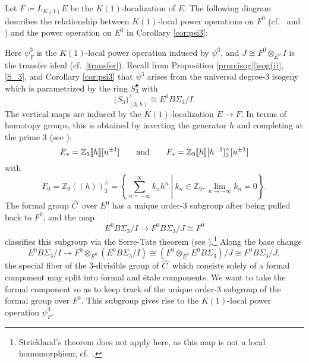 \documentclass{gtpart}
\theoremstyle{definition}
\theoremstyle{remark}
\newcommand{\mb}[1]{\mathbb{#1}}
\newcommand{\BZ}{{\mb Z}}
\newcommand{\HC}{\widehat{C~}\!}
\newcommand{\ad}{{\rm and}}
\newcommand{\p}{\psi^3}
\newcommand{\s}{S^\bullet}
\newcommand{\isog}[1]{Proposition \ref{prop:isog}\thinspace \eqref{isog(#1)}}
\begin{document}
Let $F \coloneqq L_{K(1)} E$ be the $K(1)$-localization of $E$.  The 
following diagram describes the relationship between $K(1)$-local power 
operations on $F^0$ (cf.~\cite[Section 3]{hopkins} and 
\cite[Section IX.3]{H_infty}) and the power operation on $E^0$ in 
Corollary \ref{cor:psi3}: 
\begin{center}
\end{center}
Here $\psi_F^3$ is the $K(1)$-local power operation induced by $\p$, and 
$J \cong F^0 \otimes_{E^0} I$ is the transfer ideal 
(cf.~\eqref{transfer}).  Recall from \isog{i}, \eqref{S_3}, and 
Corollary \ref{cor:psi3} that $\p$ arises from the universal degree-3 
isogeny which is parametrized by the ring $\s_3$ with 
\[
 \big( S_3 \big)_{(3,h)}^\wedge \cong E^0 B\Sigma_3 / I.  
\]
The vertical maps are induced by the $K(1)$-localization $E \to F$.  In 
terms of homotopy groups, this is obtained by inverting the generator 
$h$ and completing at the prime 3 (see \cite[Corollary 1.5.5]{hovey}): 
\[
 E_* = \BZ_9 \llbracket h \rrbracket [u^{\pm1}] \qquad \ad \qquad F_* = \BZ_9 \llbracket h \rrbracket [h^{-1}]_3^\wedge [u^{\pm1}] 
\]
with 
\[
 F_0 = \BZ_9 (\!(h)\!)_3^\wedge = \left.\left\{\sum_{n = -\infty}^{\infty} k_n h^n~\right|~k_n \in \BZ_9, \lim_{n \to -\infty} k_n = 0\right\}.  
\]
The formal group $\HC$ over $E^0$ has a unique order-3 subgroup after 
being pulled back to $F^0$, and the map 
\[
 E^0 B\Sigma_3 / I \to F^0 B\Sigma_3 / J \cong F^0 
\]
classifies this subgroup via the Serre-Tate theorem (see 
\cite[2.9.1]{KM}).\footnote{Strickland's theorem 
\cite[Theorem 1.1]{Str98} does not apply here, as this map is not a 
local homomorphism; cf.~\cite{MGPS}.  }  Along the base change 
\[
 E^0 B\Sigma_3 / I \to F^0 \otimes_{E^0} (E^0 B\Sigma_3 / I) \cong (F^0 \otimes_{E^0} E^0 B\Sigma_3) / J \cong F^0 B\Sigma_3 / J, 
\]
the special fiber of the 3-divisible group of $\HC$ which consists 
solely of a formal component may split into formal and \'etale 
components.  We want to take the formal component so as to keep track of 
the unique order-3 subgroup of the formal group over $F^0$.  This 
subgroup gives rise to the $K(1)$-local power operation $\psi_F^3$.  
\end{document}
